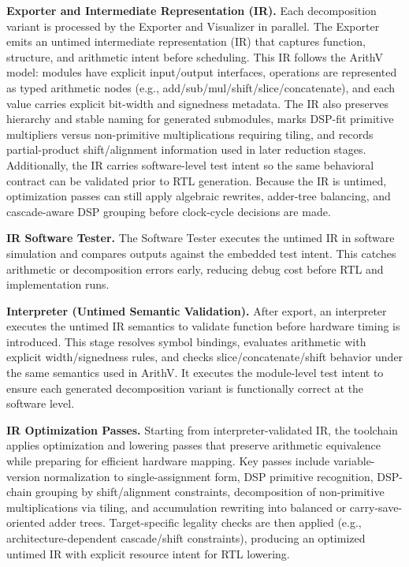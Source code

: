 \noindent\textbf{Exporter and Intermediate Representation (IR).}
Each decomposition variant is processed by the Exporter and Visualizer in parallel.
The Exporter emits an untimed intermediate representation (IR) that captures function, structure, and arithmetic intent before scheduling.
This IR follows the ArithV model: modules have explicit input/output interfaces, operations are represented as typed arithmetic nodes (e.g., add/sub/mul/shift/slice/concatenate), and each value carries explicit bit-width and signedness metadata.
The IR also preserves hierarchy and stable naming for generated submodules, marks DSP-fit primitive multipliers versus non-primitive multiplications requiring tiling, and records partial-product shift/alignment information used in later reduction stages.
Additionally, the IR carries software-level test intent so the same behavioral contract can be validated prior to RTL generation.
Because the IR is untimed, optimization passes can still apply algebraic rewrites, adder-tree balancing, and cascade-aware DSP grouping before clock-cycle decisions are made.

\noindent\textbf{IR Software Tester.}
The Software Tester executes the untimed IR in software simulation and compares outputs against the embedded test intent.
This catches arithmetic or decomposition errors early, reducing debug cost before RTL and implementation runs.

\noindent\textbf{Interpreter (Untimed Semantic Validation).}
After export, an interpreter executes the untimed IR semantics to validate function before hardware timing is introduced.
This stage resolves symbol bindings, evaluates arithmetic with explicit width/signedness rules, and checks slice/concatenate/shift behavior under the same semantics used in ArithV.
It executes the module-level test intent to ensure each generated decomposition variant is functionally correct at the software level.

\noindent\textbf{IR Optimization Passes.}
Starting from interpreter-validated IR, the toolchain applies optimization and lowering passes that preserve arithmetic equivalence while preparing for efficient hardware mapping.
Key passes include variable-version normalization to single-assignment form, DSP primitive recognition, DSP-chain grouping by shift/alignment constraints, decomposition of non-primitive multiplications via tiling, and accumulation rewriting into balanced or carry-save-oriented adder trees.
Target-specific legality checks are then applied (e.g., architecture-dependent cascade/shift constraints), producing an optimized untimed IR with explicit resource intent for RTL lowering.

